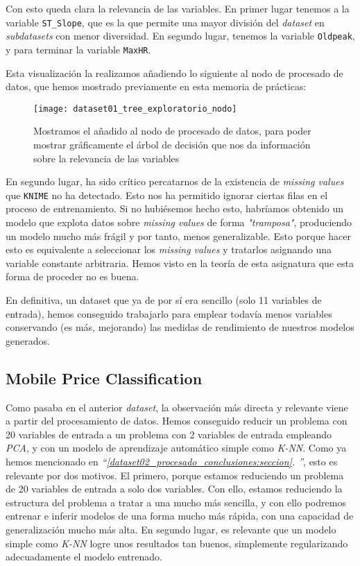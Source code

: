 \documentclass[11pt]{article}
\newcommand{\customcite}[1]{\emph{``\ref{#1}. \nameref{#1}''}}
\begin{document}
Con esto queda clara la relevancia de las variables. En primer lugar tenemos a la variable \lstinline{ST_Slope}, que es la que permite una mayor división del \emph{dataset} en \emph{subdatasets} con menor diversidad. En segundo lugar, tenemos la variable \lstinline{Oldpeak}, y para terminar la variable \lstinline{MaxHR}.

Esta visualización la realizamos añadiendo lo siguiente al nodo de procesado de datos, que hemos mostrado previamente en esta memoria de prácticas:

\begin{figure}[H]
    \centering
    \texttt{[image: dataset01\_tree\_exploratorio\_nodo]}
    \caption{Mostramos el añadido al nodo de procesado de datos, para poder mostrar gráficamente el árbol de decisión que nos da información sobre la relevancia de las variables}
\end{figure}

En segundo lugar, ha sido crítico percatarnos de la existencia de \emph{missing values} que \lstinline{KNIME} no ha detectado. Esto nos ha permitido ignorar ciertas filas en el proceso de entrenamiento. Si no hubiésemos hecho esto, habríamos obtenido un modelo que explota datos sobre \emph{missing values} de forma \emph{"tramposa"}, produciendo un modelo mucho más frágil y por tanto, menos generalizable. Esto porque hacer esto es equivalente a seleccionar los \emph{missing values} y tratarlos asignando una variable constante arbitraria. Hemos visto en la teoría de esta asignatura que esta forma de proceder no es buena.

En definitiva, un dataset que ya de por sí era sencillo (solo 11 variables de entrada), hemos conseguido trabajarlo para emplear todavía menos variables conservando (es más, mejorando) las medidas de rendimiento de nuestros modelos generados.

\pagebreak

\subsection{Mobile Price Classification}

Como pasaba en el anterior \emph{dataset}, la observación más directa y relevante viene a partir del procesamiento de datos. Hemos conseguido reducir un problema con 20 variables de entrada a un problema con 2 variables de entrada empleando \emph{PCA}, y con un modelo de aprendizaje automático simple como \emph{K-NN}. Como ya hemos mencionado en \customcite{dataset02_procesado_conclusiones:seccion}, esto es relevante por dos motivos. El primero, porque estamos reduciendo un problema de 20 variables de entrada a solo dos variables. Con ello, estamos reduciendo la estructura del problema a tratar a una mucho más sencilla, y con ello podremos entrenar e inferir modelos de una forma mucho más rápida, con una capacidad de generalización mucho más alta. En segundo lugar, es relevante que un modelo simple como \emph{K-NN} logre unos resultados tan buenos, simplemente regularizando adecuadamente el modelo entrenado.
\end{document}
